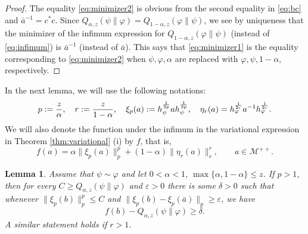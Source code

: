 \documentclass[12pt]{article}
\newtheorem{lemma}[theorem]{Lemma}
\theoremstyle{definition}
\theoremstyle{remark}
\numberwithin{equation}{section}
\def\Me{\mathcal M}
\def\ffi{\varphi}
\def\eps{\varepsilon}
\begin{document}
\begin{proof}
The equality  \eqref{eq:minimizer2} is obvious from the second equality in \eqref{eq:bc} and $\bar a^{-1}=c^*c$. Since
$Q_{\alpha,z}(\psi\|\ffi)=Q_{1-\alpha,z}(\ffi\|\psi)$, we see by uniqueness that the minimizer of the
infimum expression for $Q_{1-\alpha,z}(\ffi\|\psi)$ (instead of \eqref{eq:infimum}) is
$\bar a^{-1}$ (instead of $\bar a$). This
says that \eqref{eq:minimizer1} is the equality corresponding to \eqref{eq:minimizer2} when $\psi,\ffi,\alpha$ are replaced with
$\ffi,\psi,1-\alpha$, respectively. 



\end{proof}

In the next lemma, we will use the following notations:
\[
p:={z\over\alpha},\quad r:={z\over 1-\alpha},\quad  \xi_p(a):=h_\psi^{1\over
2p}ah_\psi^{1\over 2p},\quad \eta_r(a)=h_\ffi^{1\over
2r}a^{-1}h_\ffi^{1\over 2r}.
\]
We will also denote the function under the infimum in the variational expression in
Theorem \ref{thm:variational} (i) by $f$, that is,
\[
f(a)=\alpha\|\xi_p(a)\|_p^p
+(1-\alpha)\|\eta_r(a)\|_r^r,\qquad a\in \Me^{++}.
\]



\begin{lemma}\label{lemma:variational_majorized2} Assume that $\psi\sim\ffi$  and let $0<\alpha<1$,
$\max\{\alpha,1-\alpha\}\le z$. If $p>1$, then for every $C\ge Q_{\alpha,z}(\psi\|\ffi)$ and $\eps>0$ there is
some $\delta>0$ such that whenever $\|\xi_p(b)\|^p_p\le C$ and $\|\xi_p(b)-\xi_p(\bar
a)\|_p\ge \eps$, we have
\[
f(b)-Q_{\alpha,z}(\psi\|\ffi)\ge \delta.
\]
A similar statement holds if $r>1$.

\end{lemma}
\end{document}
